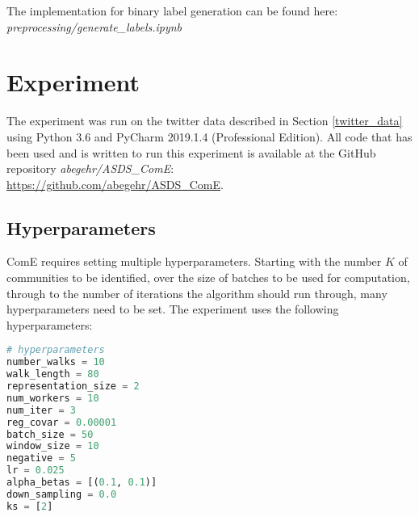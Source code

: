 \documentclass[sigconf]{acmart}
\begin{document}
The implementation for binary label generation can be found here: \textit{preprocessing/generate\_labels.ipynb}

\section{Experiment}

The experiment was run on the twitter data described in Section \ref{twitter_data} using Python 3.6 and PyCharm 2019.1.4 (Professional Edition). All code that has been used and is written to run this experiment is available at the GitHub repository \textit{abegehr/ASDS\_ComE}:\\\url{https://github.com/abegehr/ASDS_ComE}.\cite{asds}

\subsection{Hyperparameters}

ComE requires setting multiple hyperparameters. Starting with the number $K$ of communities to be identified, over the size of batches to be used for computation, through to the number of iterations the algorithm should run through, many hyperparameters need to be set.
The experiment uses the following hyperparameters:

\begin{lstlisting}[language=python]
# hyperparameters
number_walks = 10
walk_length = 80
representation_size = 2
num_workers = 10
num_iter = 3
reg_covar = 0.00001
batch_size = 50
window_size = 10
negative = 5
lr = 0.025
alpha_betas = [(0.1, 0.1)]
down_sampling = 0.0
ks = [2]
\end{lstlisting}
\end{document}
